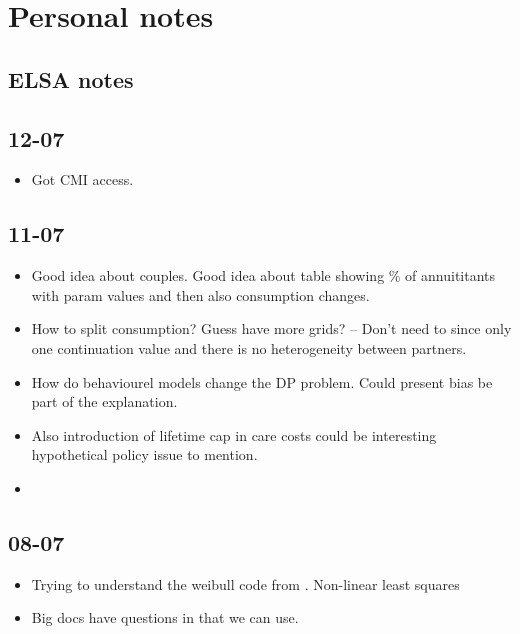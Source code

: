 \documentclass[12pt]{article}
\begin{document}
\section{Personal notes}

\subsection{ELSA notes}

\subsection{\textbf{12-07}}
\begin{itemize}

      \item Got CMI access.
\end{itemize}

\subsection{\textbf{11-07}}
\begin{itemize}
      \item Good idea about couples. Good idea about table showing \% of annuititants
            with param values and then also consumption changes.

      \item How to split consumption? Guess have more grids? -- Don't need to since only one
            continuation value and there is no heterogeneity between partners.
      \item How do behaviourel models change the DP problem. Could present bias
            be part of the explanation.

      \item Also introduction of lifetime cap in care costs could be interesting
            hypothetical policy issue to mention.

      \item
\end{itemize}


\subsection{\textbf{08-07}}
\begin{itemize}
      \item Trying to understand the weibull code from \cite{odea_sturrock_rest_2023}. Non-linear
            least squares
      \item Big docs have questions in that we can use.
\end{itemize}
\end{document}
